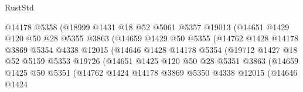 \begin{lexlean}{RustStd}
\begin{coremodule}
                              @14178
                              @5358
                              (@18999
                                @1431
                                @18
                                @52
                                @5061
                                @5357
                                @19013
                                (@14651
                                  @1429
                                  @120
                                  @50
                                  @28
                                  @5355
                                  @3863
                                  (@14659
                                    @1429
                                    @50
                                    @5355
                                    (@14762
                                      @1428
                                      @14178
                                      @3869
                                      @5354
                                      @4338
                                      @12015
                                      (@14646
                                        @1428
                                        @14178
                                        @5354
                                        (@19712
                                          @1427
                                          @18
                                          @52
                                          @5159
                                          @5353
                                          @19726
                                          (@14651
                                            @1425
                                            @120
                                            @50
                                            @28
                                            @5351
                                            @3863
                                            (@14659
                                              @1425
                                              @50
                                              @5351
                                              (@14762
                                                @1424
                                                @14178
                                                @3869
                                                @5350
                                                @4338
                                                @12015
                                                (@14646
                                                  @1424

\end{coremodule}
\end{lexlean}
